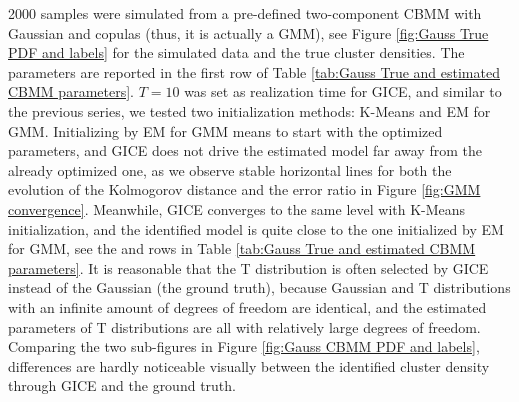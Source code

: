 2000 samples were simulated from a pre-defined two-component CBMM with Gaussian  and copulas (thus, it is actually a GMM), see Figure \ref{fig:Gauss True PDF and labels} for the simulated data and the true cluster densities. The parameters are reported in the first row of Table \ref{tab:Gauss True and estimated CBMM parameters}. 
$T=10$ was set as realization time for GICE, and similar to the previous series, we 
tested two initialization methods: K-Means and EM for GMM. 
Initializing by EM for GMM means to start with the optimized parameters, and GICE does not drive the estimated model far away from the already optimized one, as we observe stable horizontal lines for both the evolution of the Kolmogorov distance and the error ratio in Figure \ref{fig:GMM convergence}. Meanwhile, GICE converges to the same level with K-Means initialization, and the identified model is quite close to the one initialized by EM for GMM, see the  and  rows in Table \ref{tab:Gauss True and estimated CBMM parameters}. It is reasonable that 
the T distribution is often selected by GICE instead of the Gaussian (the ground truth),
because Gaussian and T distributions with an infinite amount of degrees of freedom
are identical, and the estimated parameters of T distributions are all with relatively large degrees of freedom.
Comparing the two sub-figures in Figure \ref{fig:Gauss CBMM PDF and labels}, differences are hardly noticeable visually between the identified cluster density through GICE and the ground truth.
